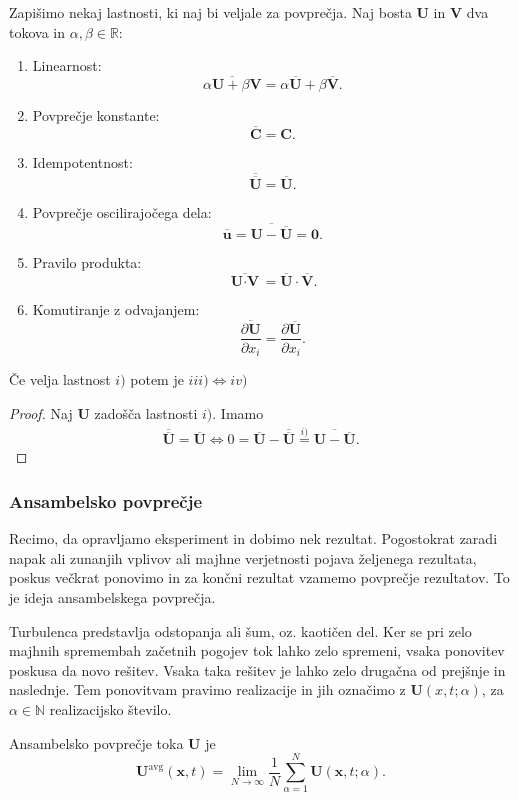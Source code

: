 \documentclass[mat2, tisk]{fmfdelo}
\newcommand{\R}{\mathbb R}
\newcommand{\N}{\mathbb N}
\newcommand{\bd}{\textbf}
\begin{document}
Zapišimo nekaj lastnosti, ki naj bi veljale za povprečja. Naj bosta $\bd{U}$ in $\bd{V}$ dva tokova in 
$\alpha, \beta \in \R$:
\begin{enumerate}
  \item[i)] Linearnost: 
  $$\overline{\alpha \bd{U} + \beta \bd{V}} = \alpha \overline{\bd{U}} + \beta\overline{\bd{V}}.$$
  \item[ii)] Povprečje konstante:
  $$ \overline{\bd{C}} = \bd{C}.$$
  \item[iii)] Idempotentnost:
  $$ \overline{\overline{\bd{U}}} = \overline{\bd{U}}.$$
  \item[iv)] Povprečje oscilirajočega dela:
  \label{lastnost iv}
  $$ \overline{\bd{u}} = \overline{\bd{U} - \overline{\bd{U}}} = \bd{0}.$$
  \item[v)] Pravilo produkta: 
  $$ \overline{\bd{U}\cdot \bd{V}} = \overline{\bd{U}}\cdot \overline{\bd{V}}. $$
  \item[vi)] Komutiranje z odvajanjem:
  $$ \overline{\frac{\partial \bd{U}}{\partial x_i}} = \frac{\partial \overline{\bd{U}}}{\partial x_i}.$$
\end{enumerate}

\begin{lema}
Če velja lastnost $i)$ potem je $iii) \iff iv)$
\end{lema}

\begin{proof}
Naj $\bd{U}$ zadošča lastnosti $i)$. Imamo
\begin{align*}
\overline{\overline{\bd{U}}} = \overline{\bd{U}} \iff 0 = \overline{\bd{U}} - \overline{\overline{\bd{U}}} \stackrel{i)}{=} 
\overline{\bd{U} - \overline{\bd{U}}}.
\end{align*}
\end{proof}

\subsubsection{Ansambelsko povprečje}
Recimo, da opravljamo eksperiment in dobimo nek rezultat. Pogostokrat zaradi napak ali 
zunanjih vplivov ali majhne verjetnosti pojava željenega rezultata, poskus večkrat ponovimo in 
za končni rezultat vzamemo povprečje rezultatov. To je ideja ansambelskega
povprečja.

Turbulenca predstavlja odstopanja ali šum, oz. kaotičen del.
Ker se pri zelo majhnih spremembah začetnih pogojev tok lahko zelo spremeni, vsaka ponovitev 
poskusa da novo rešitev. Vsaka taka rešitev je lahko zelo drugačna od prejšnje in naslednje. 
Tem ponovitvam pravimo realizacije in jih označimo z $\bd{U}(x, t; \alpha)$, za $\alpha \in \N$
realizacijsko število. 
\begin{definicija}
Ansambelsko povprečje toka $\bd{U}$ je 
\begin{equation*}
\bd{U}^\text{avg}(\bd{x}, t) = \lim_{N\rightarrow \infty} \frac{1}{N}\sum_{\alpha=1}^N \bd{U}(\bd{x}, t;\alpha). 
\end{equation*}
\end{definicija}
\end{document}
